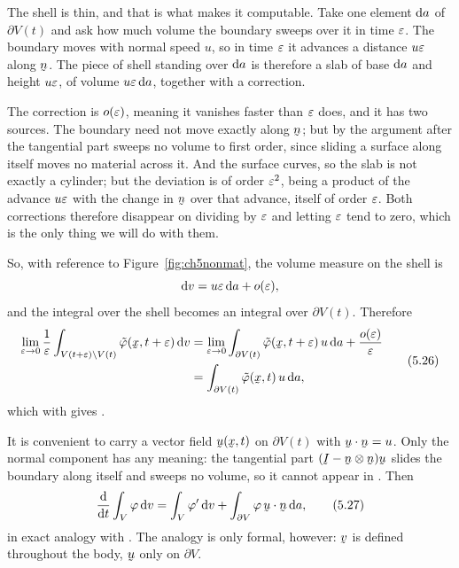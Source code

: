 The shell is thin, and that is what makes it computable. Take one element
$\mathrm{d} a$ of $\partial V(t)$ and ask how much volume the boundary sweeps
over it in time $\varepsilon$. The boundary moves with normal speed $u$, so in
time $\varepsilon$ it advances a distance $u\varepsilon$ along $\bn$. The piece of shell
standing over $\mathrm{d} a$ is therefore a slab of base $\mathrm{d} a$ and height
$u\varepsilon$, of volume $u\varepsilon\,\mathrm{d} a$, together with a correction.

The correction is $o(\varepsilon)$, meaning it vanishes faster than $\varepsilon$ does,
and it has two sources. The boundary need not move exactly along $\bn$;
but by the argument after  the tangential part sweeps no volume
to first order, since sliding a surface along itself moves no material
across it. And the surface curves, so the slab is not exactly a cylinder;
but the deviation is of order $\varepsilon^{2}$, being a product of the advance
$u\varepsilon$ with the change in $\bn$ over that advance, itself of order
$\varepsilon$. Both corrections therefore disappear on dividing by $\varepsilon$ and
letting $\varepsilon$ tend to zero, which is the only thing we will do with them.

So, with reference to Figure~\ref{fig:ch5nonmat}, the volume measure on
the shell is
\[
   \mathrm{d} v=u\varepsilon\,\mathrm{d} a+o(\varepsilon),
\]
and the integral over the shell becomes an integral over $\partial V(t)$.
Therefore
\begin{equation}
\begin{aligned}
   \lim_{\eps\to0}\frac1\eps
   \int_{V(t+\eps)\setminus V(t)}\tilde\varphi(\bx,t+\eps)\,\dl v
   &=\lim_{\eps\to0}\int_{\partial V(t)}
     \tilde\varphi(\bx,t+\eps)\,u\,\dl a+\frac{o(\eps)}{\eps}
   \\
   &=\int_{\partial V(t)}\tilde\varphi(\bx,t)\,u\,\dl a ,
\end{aligned}
   \tag{5.26}\label{eq:5.26}
\end{equation}
which with  gives .

It is convenient to carry a vector field $\bu(\bx,t)$ on $\partial V(t)$
with $\ip\bu\bn=u$. Only the normal component has any meaning: the
tangential part $(\I-\bn\otimes\bn)\bu$ slides the boundary along itself
and sweeps no volume, so it cannot appear in . Then
\begin{equation}
   \frac{\dl}{\dl t}\int_{V}\varphi\,\dl v
   =\int_{V}\varphi'\,\dl v+\int_{\partial V}\varphi\,\ip\bu\bn\,\dl a ,
   \tag{5.27}\label{eq:5.27}
\end{equation}
in exact analogy with . The analogy is only formal, however:
$\bv$ is defined throughout the body, $\bu$ only on $\partial V$.

